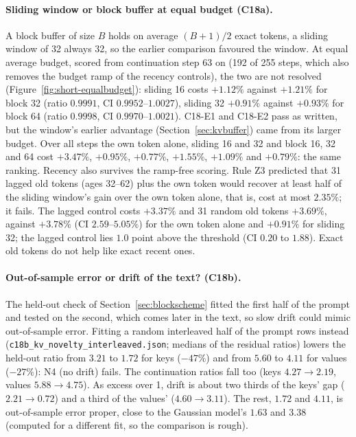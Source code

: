 \documentclass[10pt]{article}
\theoremstyle{plain}
\theoremstyle{definition}
\theoremstyle{remark}
\newcommand{\rl}[1]{\textsf{#1}}%
\begin{document}
\paragraph{Sliding window or block buffer at equal budget (C18a).} A block buffer of size $B$ holds on average $(B+1)/2$ exact tokens, a sliding window of 32 always 32, so the earlier comparison favoured the window. At equal average budget, scored from continuation step 63 on (192 of 255 steps, which also removes the budget ramp of the recency controls), the two are not resolved (Figure~\ref{fig:short-equalbudget}): sliding 16 costs $+1.12\%$ against $+1.21\%$ for block 32 (ratio $0.9991$, CI $0.9952$--$1.0027$), sliding 32 $+0.91\%$ against $+0.93\%$ for block 64 (ratio $0.9998$, CI $0.9970$--$1.0021$). \rl{C18-E1} and \rl{C18-E2} pass as written, but the window's earlier advantage (Section~\ref{sec:kvbuffer}) came from its larger budget. Over all steps the own token alone, sliding 16 and 32 and block 16, 32 and 64 cost $+3.47\%$, $+0.95\%$, $+0.77\%$, $+1.55\%$, $+1.09\%$ and $+0.79\%$: the same ranking. Recency also survives the ramp-free scoring. Rule \rl{Z3} predicted that 31 lagged old tokens (ages 32--62) plus the own token would recover at least half of the sliding window's gain over the own token alone, that is, cost at most $2.35\%$; it fails. The lagged control costs $+3.37\%$ and 31 random old tokens $+3.69\%$, against $+3.78\%$ (CI $2.59$--$5.05\%$) for the own token alone and $+0.91\%$ for sliding 32; the lagged control lies $1.0$ point above the threshold (CI $0.20$ to $1.88$). Exact old tokens do not help like exact recent ones.

\paragraph{Out-of-sample error or drift of the text? (C18b).} The held-out check of Section~\ref{sec:blockscheme} fitted the first half of the prompt and tested on the second, which comes later in the text, so slow drift could mimic out-of-sample error. Fitting a random interleaved half of the prompt rows instead (\texttt{c18b\_kv\_novelty\_interleaved.json}; medians of the residual ratios) lowers the held-out ratio from $3.21$ to $1.72$ for keys ($-47\%$) and from $5.60$ to $4.11$ for values ($-27\%$): \rl{N4} (no drift) fails. The continuation ratios fall too (keys $4.27\to2.19$, values $5.88\to4.75$). As excess over 1, drift is about two thirds of the keys' gap ($2.21\to0.72$) and a third of the values' ($4.60\to3.11$). The rest, $1.72$ and $4.11$, is out-of-sample error proper, close to the Gaussian model's $1.63$ and $3.38$ (computed for a different fit, so the comparison is rough).
\end{document}
